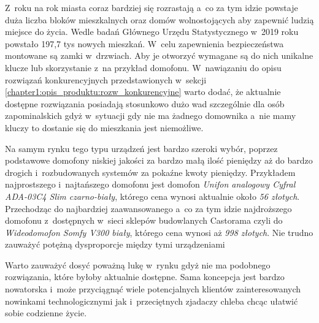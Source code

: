 \documentclass[../main.tex]{subfiles}
\begin{document}
 {
    Z~roku na rok miasta coraz bardziej się rozrastają a~co za tym idzie powstaje duża
    liczba bloków mieszkalnych oraz domów wolnostojących aby zapewnić ludzią miejsce do
    życia. Wedle badań Głównego Urzędu Statystycznego w~2019 roku powstało 197,7 tys
    nowych mieszkań\cite{gospodarka_mieszkaniowa}. W~celu zapewnienia bezpieczeństwa
    montowane są zamki w~drzwiach. Aby je otworzyć wymagane są do nich unikalne
    klucze lub skorzystanie z~na przykład domofonu. W~nawiązaniu do opisu rozwiązań
    konkurencyjnych przedstawionych w~sekcji
    \ref{chapter1:opis_produktu:rozw_konkurencyjne} warto dodać, że aktualnie dostępne
    rozwiązania posiadają stosunkowo dużo wad szczególnie dla osób zapominalskich gdyż
    w~sytuacji gdy nie ma żadnego domownika a~nie mamy kluczy to dostanie się do
    mieszkania jest niemożliwe.

    Na samym rynku tego typu urządzeń jest bardzo szeroki wybór, poprzez
    podstawowe domofony niskiej jakości za bardzo małą ilość pieniędzy aż do bardzo
    drogich i~rozbudowanych systemów za pokaźne kwoty pieniędzy. Przykładem
    najprostszego i~najtańszego domofonu jest domofon
    \textit{Unifon analogowy Cyfral ADA-03C4 Slim czarno-biały}, którego cena wynosi
    aktualnie około \textit{56 złotych}\cite{tani_domofon}. Przechodząc do najbardziej
    zaawansowanego a~co za tym idzie najdroższego domofonu z~dostępnych w~sieci sklepów
    budowlanych Castorama czyli do \textit{Wideodomofon Somfy V300 biały}, którego cena
    wynosi aż \textit{998 złotych}\cite{drogi_domofon}. Nie trudno zauważyć potężną
    dysproporcje między tymi urządzeniami

    Warto zauważyć dosyć poważną lukę w~rynku gdyż nie ma podobnego rozwiązania,
    które byłoby aktualnie dostępne. Sama koncepcja jest bardzo nowatorska i~może
    przyciągnąć wiele potencjalnych klientów zainteresowanych nowinkami
    technologicznymi jak i~przeciętnych zjadaczy chleba chcąc ułatwić sobie codzienne
    życie.
}
\end{document}
